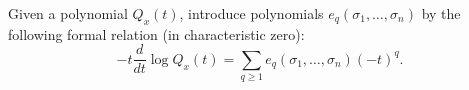 Given a polynomial $Q_x(t)$, introduce polynomials $e_q(\sigma_1, \ldots, \sigma_n)$ by the following formal relation (in characteristic zero):
$$
-t \frac{d}{dt} \log Q_x(t) = \sum_{q \geq 1} e_q(\sigma_1, \ldots, \sigma_n)(-t)^q.
$$
